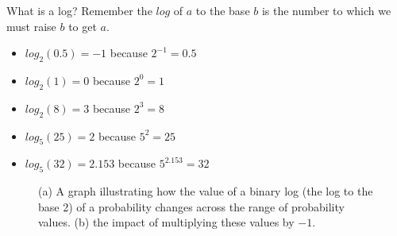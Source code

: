 \documentclass[xcolor={table}]{beamer}
\begin{document}
\begin{frame}
							\begin{block}{What is a log?}
							Remember the $log$ of $a$ to the base $b$ is the number to which we must raise $b$ to get $a$. 
							\begin{itemize}
							\item $log_{2}(0.5) = -1$ because $2^{-1} = 0.5$
							\item $log_{2}(1)=0$ because $2^{0} = 1$
							\item $log_{2}(8) = 3$ because $2^3 = 8$
							\item $log_{5}(25) = 2$ because $5^2 = 25$		
							\item $log_{5}(32) = 2.153$ because $5^{2.153} = 32$
							\end{itemize}
							\end{block}
\end{frame}



 \begin{frame} 
\begin{figure}
\centering
	\caption{(a) A graph illustrating how the value of a binary log (the log to the base 2) of a probability changes across the range of probability values. (b) the impact of multiplying these values by $-1$.}
	\label{fig:logprob}
\end{figure}
\end{frame} 
\end{document}
